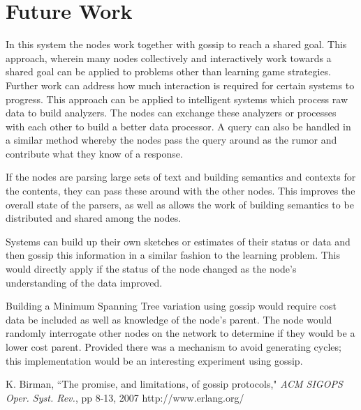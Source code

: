 \documentclass[11pt,twocolumn]{article}
\begin{document}
\section{Future Work}

In this system the nodes work together with gossip to reach a shared goal.  This approach, wherein many nodes collectively and interactively work towards a shared goal can be applied to problems other than learning game strategies.  Further work can address how much interaction is required for certain systems to progress.  This approach can be applied to intelligent systems which process raw data to build analyzers.  The nodes can exchange these analyzers or processes with each other to build a better data processor.  A query can also be handled in a similar method whereby the nodes pass the query around as the rumor and contribute what they know of a response.

If the nodes are parsing large sets of text and building semantics and contexts for the contents, they can pass these around with the other nodes.  This improves the overall state of the parsers, as well as allows the work of building semantics to be distributed and shared among the nodes.

Systems can build up their own sketches or estimates of their status or data and then gossip this information in a similar fashion to the learning problem.  This would directly apply if the status of the node changed as the node's understanding of the data improved.

Building a Minimum Spanning Tree variation using gossip would require cost data  be included as well as knowledge of the node's parent.  The node would randomly interrogate other nodes on the network to determine if they would be a lower cost parent.  Provided there was a mechanism to avoid generating cycles; this implementation would be an interesting experiment using gossip.

\begin{thebibliography}{10}
K. Birman, ``The promise, and limitations, of gossip protocols," \emph{ACM SIGOPS Oper. Syst. Rev.}, pp 8-13, 2007
http://www.erlang.org/
\end{thebibliography}
\end{document}
